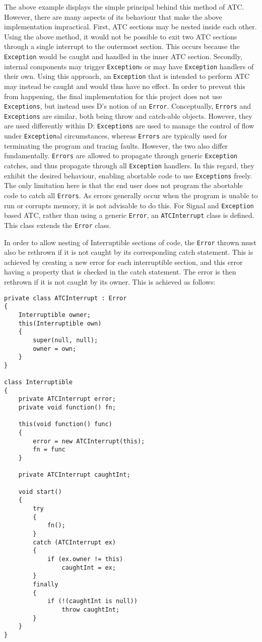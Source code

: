 The above example displays the simple principal behind this method of ATC.
However, there are many aspects of its behaviour that make the above
implementation impractical. 
First, ATC sections may be nested inside each other. Using the above 
method, it would not be possible to exit two ATC sections through a single interrupt
to the outermost section. This occurs because the \texttt{Exception} would be caught and
handled in the inner ATC section. 
Secondly, internal components may trigger \texttt{Exception}s or may have \texttt{Exception} handlers 
of their own. Using this approach, an \texttt{Exception} that is intended to perform ATC 
may instead be caught and would thus have no effect. 
In order to prevent this from happening, the final implementation for this
project does not use \texttt{Exceptions}, but instead uses D's notion of an
\texttt{Error}. Conceptually, \texttt{Errors} and \texttt{Exceptions} are
similar, both being throw and catch-able objects. 
However, they are used differently within D: \texttt{Exceptions} are used to
manage the control of flow under \texttt{Exception}al circumstances, whereas
\texttt{Errors} are typically used for terminating the program and tracing faults. 
However, the two also differ fundamentally. 
\texttt{Errors} are allowed to propagate through generic \texttt{Exception} catches, and thus propagate 
through all \texttt{Exception} handlers. In this regard, they exhibit the desired
behaviour, enabling abortable code to use \texttt{Exceptions} freely. The only
limitation here is that the end user does not program the
abortable code to catch all \texttt{Errors}. As errors generally occur when the
program is unable to run or corrupts memory, it is not advisable to do this. 
For Signal and \texttt{Exception} based ATC, rather than using a generic
\texttt{Error}, an \texttt{ATCInterrupt} class is defined. 
This class extends the \texttt{Error} class.
\par\bigskip\noindent
In order to allow nesting of Interruptible sections of code, the \texttt{Error} thrown
must also be rethrown if it is not caught by its corresponding catch statement. 
This is achieved by creating a new error for each interruptible section, and
this error having a property that is checked in the catch statement. The error
is then rethrown if it is not caught by its owner. 
This is achieved as follows: 
\begin{lstlisting}[basicstyle=\small]
private class ATCInterrupt : Error
{
    Interruptible owner;
    this(Interruptible own)
    {
        super(null, null);
        owner = own;
    }
}

class Interruptible
{
    private ATCInterrupt error; 
    private void function() fn; 

    this(void function() func)
    {
        error = new ATCInterrupt(this); 
        fn = func
    }

    private ATCInterrupt caughtInt;

    void start()
    {
        try
        {
            fn();
        }
        catch (ATCInterrupt ex)
        {
            if (ex.owner != this)
                caughtInt = ex;
        }
        finally
        {
            if (!(caughtInt is null))
                throw caughtInt;
        }
    }
}
\end{lstlisting}

